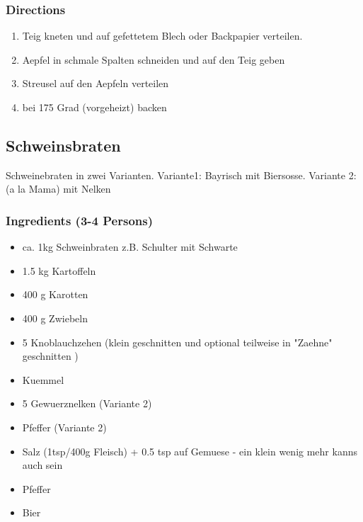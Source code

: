 \subsubsection*{Directions}
\begin{enumerate}
\item Teig kneten und auf gefettetem Blech oder Backpapier verteilen.
\item Aepfel in schmale Spalten schneiden und auf den Teig geben
\item Streusel auf den Aepfeln verteilen
\item bei 175 Grad (vorgeheizt) backen
\end{enumerate}
\pagebreak

\subsection{Schweinsbraten}
Schweinebraten in zwei Varianten. Variante1: Bayrisch mit Biersosse. Variante 2: (a la Mama) mit Nelken
\subsubsection*{Ingredients (3-4 Persons)}
\begin{itemize}
\item[] ca. 1kg Schweinbraten z.B. Schulter mit Schwarte
\item[] 1.5 kg Kartoffeln
\item[] 400 g Karotten
\item[] 400 g Zwiebeln
\item[] 5 Knoblauchzehen (klein geschnitten und optional teilweise in "Zaehne" geschnitten )
\item[] Kuemmel 
\item[] 5 Gewuerznelken (Variante 2)
\item[] Pfeffer (Variante 2)
\item[] Salz (1tsp/400g Fleisch) + 0.5 tsp auf Gemuese - ein klein wenig mehr kanns auch sein
\item[] Pfeffer
\item[] Bier
\end{itemize}
